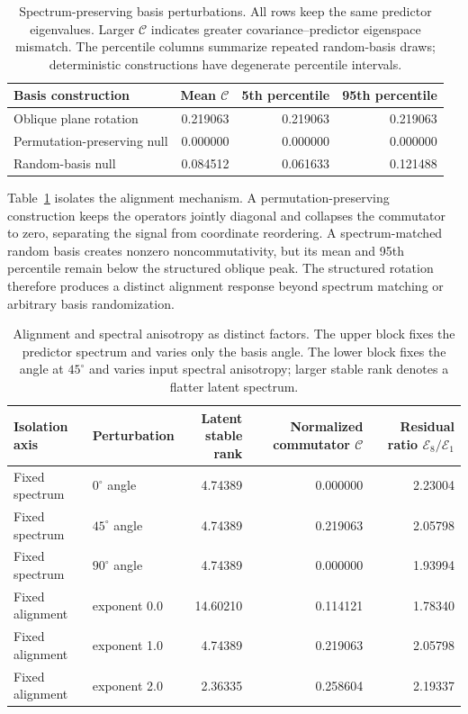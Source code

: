 \documentclass{article}
\begin{document}
\begin{table}[t]
\centering
\caption{Spectrum-preserving basis perturbations. All rows keep the same predictor eigenvalues. Larger $\mathcal C$ indicates greater covariance--predictor eigenspace mismatch. The percentile columns summarize repeated random-basis draws; deterministic constructions have degenerate percentile intervals.}
\label{tab:nulls}
\begin{tabular*}{\linewidth}{@{\extracolsep{\fill}}lrrr@{}}
\toprule
Basis construction & Mean $\mathcal C$ & 5th percentile & 95th percentile \\
\midrule
Oblique plane rotation & 0.219063 & 0.219063 & 0.219063 \\
Permutation-preserving null & 0.000000 & 0.000000 & 0.000000 \\
Random-basis null & 0.084512 & 0.061633 & 0.121488 \\
\bottomrule
\end{tabular*}
\end{table}

Table~\ref{tab:nulls} isolates the alignment mechanism. A permutation-preserving construction keeps the operators jointly diagonal and collapses the commutator to zero, separating the signal from coordinate reordering. A spectrum-matched random basis creates nonzero noncommutativity, but its mean and 95th percentile remain below the structured oblique peak. The structured rotation therefore produces a distinct alignment response beyond spectrum matching or arbitrary basis randomization.

\begin{table}[t]
\centering
\caption{Alignment and spectral anisotropy as distinct factors. The upper block fixes the predictor spectrum and varies only the basis angle. The lower block fixes the angle at $45^\circ$ and varies input spectral anisotropy; larger stable rank denotes a flatter latent spectrum.}
\label{tab:decoupling}
\setlength{\tabcolsep}{3pt}
\begin{tabular*}{\linewidth}{@{\extracolsep{\fill}}llrrr@{}}
\toprule
Isolation axis & Perturbation & \shortstack{Latent\\stable rank} & \shortstack{Normalized\\commutator $\mathcal C$} & \shortstack{Residual ratio\\$\mathcal E_8/\mathcal E_1$} \\
\midrule
Fixed spectrum & $0^\circ$ angle & 4.74389 & 0.000000 & 2.23004 \\
Fixed spectrum & $45^\circ$ angle & 4.74389 & 0.219063 & 2.05798 \\
Fixed spectrum & $90^\circ$ angle & 4.74389 & 0.000000 & 1.93994 \\
\midrule
Fixed alignment & exponent 0.0 & 14.60210 & 0.114121 & 1.78340 \\
Fixed alignment & exponent 1.0 & 4.74389 & 0.219063 & 2.05798 \\
Fixed alignment & exponent 2.0 & 2.36335 & 0.258604 & 2.19337 \\
\bottomrule
\end{tabular*}
\end{table}
\end{document}
